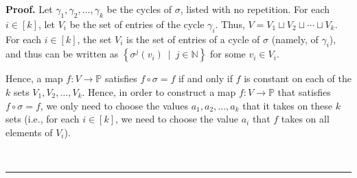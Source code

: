 \documentclass[numbers=enddot,12pt,final,onecolumn,notitlepage]{scrartcl}%
\numberwithin{exer}{section}
\theoremstyle{definition}
\newenvironment{proof}[1][Proof]{\noindent\textbf{#1.} }{\ \rule{0.5em}{0.5em}}
\newenvironment{vershort}{}{}
\begin{document}
\begin{vershort}


\begin{proof}
Let $\gamma_{1},\gamma_{2},\ldots,\gamma_{k}$ be the cycles of $\sigma$,
listed with no repetition. For each $i\in\left[  k\right]  $, let $V_{i}$ be
the set of entries of the cycle $\gamma_{i}$. Thus, $V=V_{1}\sqcup V_{2}%
\sqcup\cdots\sqcup V_{k}$. For each $i\in\left[  k\right]  $, the set $V_{i}$
is the set of entries of a cycle of $\sigma$ (namely, of $\gamma_{i}$), and
thus can be written as $\left\{  \sigma^{j}\left(  v_{i}\right)  \ \mid
\ j\in\mathbb{N}\right\}  $ for some $v_{i}\in V_{i}$.

Hence, a map $f:V\rightarrow\mathbb{P}$ satisfies $f\circ\sigma=f$ if and only
if $f$ is constant on each of the $k$ sets $V_{1},V_{2},\ldots,V_{k}$. Hence,
in order to construct a map $f:V\rightarrow\mathbb{P}$ that satisfies
$f\circ\sigma=f$, we only need to choose the values $a_{1},a_{2},\ldots,a_{k}$
that it takes on these $k$ sets (i.e., for each $i\in\left[  k\right]  $, we
need to choose the value $a_{i}$ that $f$ takes on all elements of $V_{i}$).


\end{proof}
\end{vershort}
\end{document}
